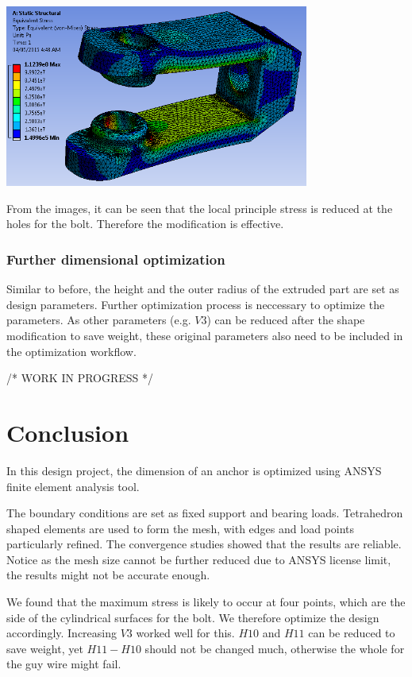 \documentclass[a4paper,14pt]{extarticle}
\begin{document}
\begin{center}\includegraphics[width=0.75\textwidth]{NX/STRESS2.PNG}\end{center}

From the images, it can be seen that the local principle stress is reduced at the holes for the bolt. Therefore the modification is effective.
\subsubsection{Further dimensional optimization}
Similar to before, the height and the outer radius of the extruded part are set as design parameters. Further optimization process is neccessary to optimize the parameters. As other parameters (e.g. $V3$) can be reduced after the shape modification to save weight, these original parameters also need to be included in the optimization workflow.

/* WORK IN PROGRESS */

\section{Conclusion}
In this design project, the dimension of an anchor is optimized using ANSYS finite element analysis tool. 

The boundary conditions are set as fixed support and bearing loads. Tetrahedron shaped elements are used to form the mesh, with edges and load points particularly refined. The convergence studies showed that the results are reliable. Notice as the mesh size cannot be further reduced due to ANSYS license limit, the results might not be accurate enough.

We found that the maximum stress is likely to occur at four points, which are the side of the cylindrical surfaces for the bolt. We therefore optimize the design accordingly. Increasing $V3$ worked well for this. $H10$ and $H11$ can be reduced to save weight, yet $H11 - H10$ should not be changed much, otherwise the whole for the guy wire might fail.
\end{document}
